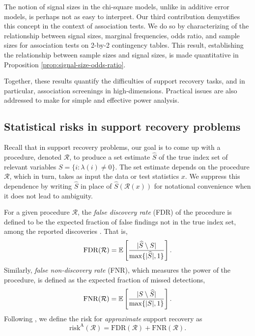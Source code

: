 The notion of signal sizes in the chi-square models, unlike in additive error models, is perhaps not as easy to interpret.
Our third contribution demystifies this concept in the context of association tests.
We do so by characterizing of the relationship between signal sizes, marginal frequencies, odds ratio, and sample sizes for association tests on 2-by-2 contingency tables.
This result, establishing the relationship between sample sizes and signal sizes, is made quantitative in Proposition \ref{prop:signal-size-odds-ratio}.

Together, these results quantify the difficulties of support recovery tasks, and in particular, association screenings in high-dimensions.
Practical issues are also addressed to make for simple and effective power analysis.

\subsection{Statistical risks in support recovery problems}
\label{subsec:risks}

Recall that in support recovery problems, our goal is to come up with a procedure, denoted $\mathcal R$, to produce a set estimate $\widehat{S}$ of the true index set of relevant variables  $S=\{i:\lambda(i)\neq 0\}$.
The set estimate depends on the procedure $\mathcal{R}$, which in turn, takes as input the data or test statistics $x$.
We suppress this dependence by writing $\widehat{S}$ in place of $\widehat{S}(\mathcal{R}(x))$ for notational convenience when it does not lead to ambiguity.

For a given procedure $\mathcal{R}$, the \emph{false discovery rate} (FDR) of the procedure is defined to be the expected fraction of false findings not in the true index set, among the reported discoveries \cite{benjamini1995controlling}. That is,
\begin{equation} \label{eq:FDR}
    \mathrm{FDR}(\mathcal{R}) = \E\left[\frac{|\widehat{S}\setminus S|}{\max\{|\widehat{S}|,1\}}\right].
\end{equation}
Similarly, \emph{false non-discovery rate} (FNR), which measures the power of the procedure, is defined as the expected fraction of missed detections,
\begin{equation} \label{eq:FNR}
    \mathrm{FNR}(\mathcal{R}) = \E\left[\frac{|S\setminus \widehat{S}|}{\max\{|{S}|,1\}}\right].
\end{equation}
Following \cite{arias2017distribution, rabinovich2017optimal}, we define the risk for \emph{approximate} support recovery as
\begin{equation} \label{eq:risk-approximate}
    \mathrm{risk}^{\mathrm{A}}(\mathcal{R}) = \mathrm{FDR}(\mathcal{R}) + \mathrm{FNR}(\mathcal{R}).
\end{equation}

